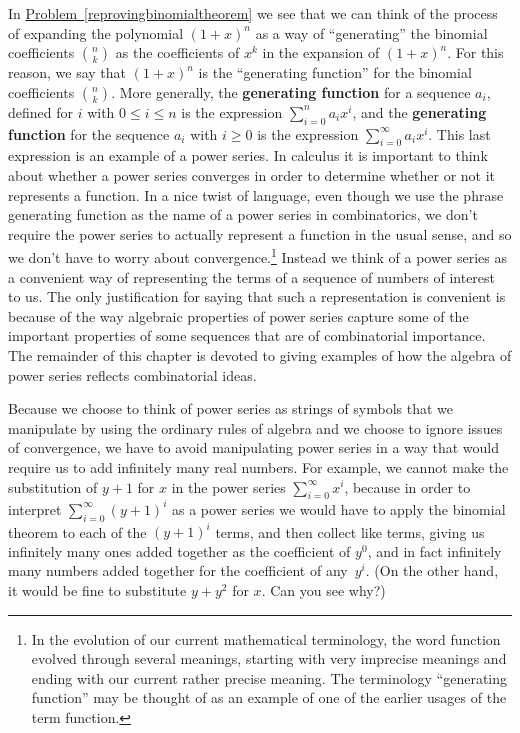 \documentclass[10pt,]{book}
\newcommand{\terminology}[1]{\textbf{#1}}
\theoremstyle{plain}
\theoremstyle{definition}
\theoremstyle{definition}
\numberwithin{equation}{chapter}
\begin{document}
In \hyperref[reprovingbinomialtheorem]{Problem~\ref{reprovingbinomialtheorem}} we see that we can think of the process of expanding the polynomial \((1+x)^n\) as a way of ``generating'' the binomial coefficients \(\binom{n}{k}\) as the coefficients of \(x^k\) in the expansion of \((1+x)^n\). For this reason, we say that \((1+x)^n\) is the ``generating function'' for the binomial coefficients \(\binom{n}{k}\). More generally, the \terminology{generating function} for a sequence \(a_i\), defined for \(i\) with \(0\le i\le n\) is the expression \(\sum_{i=0}^n a_ix^i\), and the \terminology{generating function} for the sequence \(a_i\) with \(i\ge 0\) is the expression \(\sum_{i=0}^\infty a_ix^i\). This last expression is an example of a power series. In calculus it is important to think about whether a power series converges in order to determine whether or not it represents a function. In a nice twist of language, even though we use the phrase generating function as the name of a power series in combinatorics, we don't require the power series to actually represent a function in the usual sense, and so we don't have to worry about convergence.\footnote{In the evolution of our current mathematical terminology, the word function evolved through several meanings, starting with very imprecise meanings and ending with our current rather precise meaning.  The terminology ``generating function'' may be thought of as an example of one of the earlier usages of the term function.\label{fn-11}} Instead we think of a power series as a convenient way of representing the terms of a sequence of numbers of interest to us. The only justification for saying that such a representation is convenient is because of the way algebraic properties of power series capture some of the important properties of some sequences that are of combinatorial importance. The remainder of this chapter is devoted to giving examples of how the algebra of power series reflects combinatorial ideas.%
\par
Because we choose to think of power series as strings of symbols that we manipulate by using the ordinary rules of algebra and we choose to ignore issues of convergence, we have to avoid manipulating power series in a way that would require us to add infinitely many real numbers. For example, we cannot make the substitution of \(y+1\) for \(x\) in the power series \(\sum_{i=0}^\infty x^i\), because in order to interpret \(\sum_{i=0}^\infty (y+1)^i\) as a power series we would have to apply the binomial theorem to each of the \((y+1)^i\) terms, and then collect like terms, giving us infinitely many ones added together as the coefficient of \(y^0\), and in fact infinitely many numbers added together for the coefficient of any~\(y^i\). (On the other hand, it would be fine to substitute \(y+y^2\) for \(x\). Can you see why?)%
\typeout{************************************************}
\typeout{************************************************}
\end{document}
